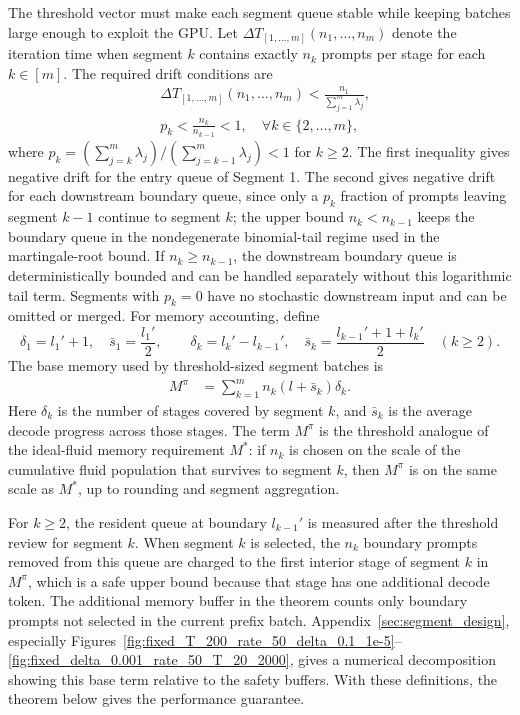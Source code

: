 The threshold vector must make each segment queue stable while keeping batches large enough to exploit the GPU. Let \(\Delta T_{[1,\dots,m]}(n_1,\dots,n_m)\) denote the iteration time when segment \(k\) contains exactly \(n_k\) prompts per stage for each \(k\in[m]\). The required drift conditions are
\begin{equation}
    \label{eq:nested_wait_thresholds}
    \begin{aligned}
    &\Delta T_{[1,\dots,m]}(n_1, \dots, n_m) <\frac{n_1}{\sum_{j=1}^m \lambda_j}, \\
    &p_k < \frac{n_k}{n_{k-1}} < 1,\quad \forall k \in \{2, \dots, m\},
    \end{aligned}
\end{equation}
where \(p_k = (\sum_{j=k}^m\lambda_j)/(\sum_{j=k-1}^m\lambda_j)<1\) for \(k\ge2\). The first inequality gives negative drift for the entry queue of Segment 1. The second gives negative drift for each downstream boundary queue, since only a \(p_k\) fraction of prompts leaving segment \(k-1\) continue to segment \(k\); the upper bound \(n_k<n_{k-1}\) keeps the boundary queue in the nondegenerate binomial-tail regime used in the martingale-root bound. If \(n_k\ge n_{k-1}\), the downstream boundary queue is deterministically bounded and can be handled separately without this logarithmic tail term. Segments with \(p_k=0\) have no stochastic downstream input and can be omitted or merged. For memory accounting, define
\[
\delta_1=l_1'+1,\quad \bar s_1=\frac{l_1'}{2},\qquad
\delta_k=l_k'-l_{k-1}',\quad \bar s_k=\frac{l_{k-1}'+1+l_k'}{2}\quad (k\ge2).
\]
The base memory used by threshold-sized segment batches is
\begin{equation}
    \label{eq:nested_wait_memory}
\begin{aligned}
        M^\pi &= \sum_{k=1}^m n_k (l+\bar s_k)\delta_k .
\end{aligned}
\end{equation}
Here \(\delta_k\) is the number of stages covered by segment \(k\), and \(\bar s_k\) is the average decode progress across those stages. The term \(M^\pi\) is the threshold analogue of the ideal-fluid memory requirement \(M^*\): if \(n_k\) is chosen on the scale of the cumulative fluid population that survives to segment \(k\), then \(M^\pi\) is on the same scale as \(M^*\), up to rounding and segment aggregation.

For \(k\ge2\), the resident queue at boundary \(l_{k-1}'\) is measured after the threshold review for segment \(k\). When segment \(k\) is selected, the \(n_k\) boundary prompts removed from this queue are charged to the first interior stage of segment \(k\) in \(M^\pi\), which is a safe upper bound because that stage has one additional decode token. The additional memory buffer in the theorem counts only boundary prompts not selected in the current prefix batch. Appendix~\ref{sec:segment_design}, especially Figures~\ref{fig:fixed_T_200_rate_50_delta_0.1_1e-5}--\ref{fig:fixed_delta_0.001_rate_50_T_20_2000}, gives a numerical decomposition showing this base term relative to the safety buffers. With these definitions, the theorem below gives the performance guarantee.

